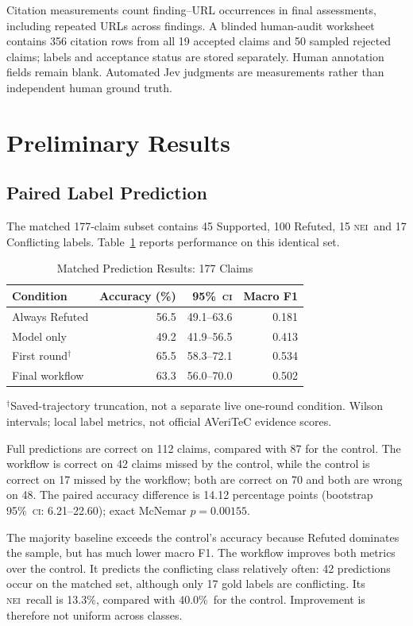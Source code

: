 \documentclass[conference]{IEEEtran}
\newcommand{\NEI}{\textsc{nei}}
\newcommand{\CI}{\textsc{ci}}
\newcommand{\pct}{\%}
\begin{document}
Citation measurements count finding--URL occurrences in final assessments, including repeated URLs across findings. A blinded human-audit worksheet contains 356 citation rows from all 19 accepted claims and 50 sampled rejected claims; labels and acceptance status are stored separately. Human annotation fields remain blank. Automated Jev judgments are measurements rather than independent human ground truth.

\section{Preliminary Results}
\subsection{Paired Label Prediction}
The matched 177-claim subset contains 45 Supported, 100 Refuted, 15 \NEI\ and 17 Conflicting labels. Table~\ref{tab:prediction} reports performance on this identical set.

\begin{table}[t]
\caption{Matched Prediction Results: 177 Claims}
\label{tab:prediction}
\centering
\footnotesize
\begin{tabular}{@{}lrrr@{}}
\toprule
Condition & Accuracy (\pct) & 95\pct\ \CI & Macro F1\\
\midrule
Always Refuted & 56.5 & 49.1--63.6 & 0.181\\
Model only & 49.2 & 41.9--56.5 & 0.413\\
First round$^{\dagger}$ & 65.5 & 58.3--72.1 & 0.534\\
Final workflow & 63.3 & 56.0--70.0 & 0.502\\
\bottomrule
\end{tabular}
\par\smallskip
\parbox{\columnwidth}{\scriptsize $^{\dagger}$Saved-trajectory truncation, not a separate live one-round condition. Wilson intervals; local label metrics, not official AVeriTeC evidence scores.}
\end{table}

Full predictions are correct on 112 claims, compared with 87 for the control. The workflow is correct on 42 claims missed by the control, while the control is correct on 17 missed by the workflow; both are correct on 70 and both are wrong on 48. The paired accuracy difference is 14.12 percentage points (bootstrap 95\pct\ \CI: 6.21--22.60); exact McNemar $p=0.00155$.

The majority baseline exceeds the control's accuracy because Refuted dominates the sample, but has much lower macro F1. The workflow improves both metrics over the control. It predicts the conflicting class relatively often: 42 predictions occur on the matched set, although only 17 gold labels are conflicting. Its \NEI\ recall is 13.3\pct, compared with 40.0\pct\ for the control. Improvement is therefore not uniform across classes.
\end{document}
